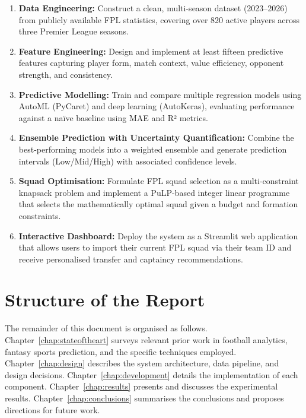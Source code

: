 \documentclass[11pt,english,listoffigures,listoftables]{tfgetsinf}
\begin{document}
\begin{enumerate}
    \item \textbf{Data Engineering:} Construct a clean, multi-season dataset (2023--2026) from publicly available FPL statistics, covering over 820 active players across three Premier League seasons.

    \item \textbf{Feature Engineering:} Design and implement at least fifteen predictive features capturing player form, match context, value efficiency, opponent strength, and consistency.

    \item \textbf{Predictive Modelling:} Train and compare multiple regression models using AutoML (PyCaret) and deep learning (AutoKeras), evaluating performance against a naïve baseline using MAE and R² metrics.

    \item \textbf{Ensemble Prediction with Uncertainty Quantification:} Combine the best-performing models into a weighted ensemble and generate prediction intervals (Low/Mid/High) with associated confidence levels.

    \item \textbf{Squad Optimisation:} Formulate FPL squad selection as a multi-constraint knapsack problem and implement a PuLP-based integer linear programme that selects the mathematically optimal squad given a budget and formation constraints.

    \item \textbf{Interactive Dashboard:} Deploy the system as a Streamlit web application that allows users to import their current FPL squad via their team ID and receive personalised transfer and captaincy recommendations.
\end{enumerate}

\section{Structure of the Report}

The remainder of this document is organised as follows. Chapter~\ref{chap:stateoftheart} surveys relevant prior work in football analytics, fantasy sports prediction, and the specific techniques employed. Chapter~\ref{chap:design} describes the system architecture, data pipeline, and design decisions. Chapter~\ref{chap:development} details the implementation of each component. Chapter~\ref{chap:results} presents and discusses the experimental results. Chapter~\ref{chap:conclusions} summarises the conclusions and proposes directions for future work.
\end{document}
